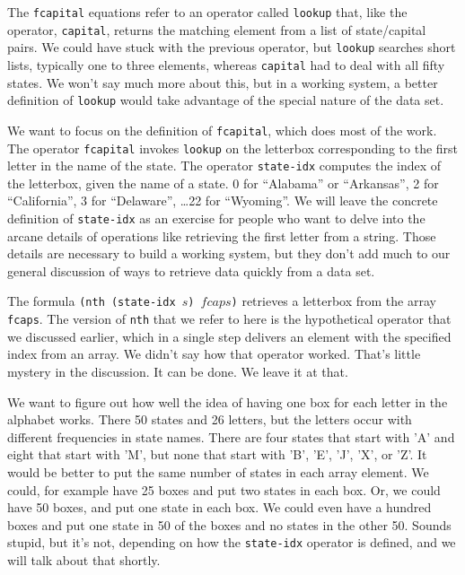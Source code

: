 The \texttt{fcapital} equations refer to an operator
called \texttt{lookup} that, like the operator, \texttt{capital},
returns the matching element from a list of state/capital pairs.
We could have stuck with the previous operator,
but \texttt{lookup} searches short lists,
typically one to three elements,
whereas \texttt{capital} had to deal with all fifty states.
We won't say much more about this, but in a working system,
a better definition of \texttt{lookup}
would take advantage of the special nature of the data set.

We want to focus on the definition of \texttt{fcapital},
which does most of the work.
The operator \texttt{fcapital} invokes \texttt{lookup}
on the letterbox corresponding to the first letter
in the name of the state.
The operator \texttt{state-idx} computes the index
of the letterbox, given the name of a state.
0 for ``Alabama'' or ``Arkansas'', 2 for ``California'',
3 for ``Delaware'', \dots 22 for  ``Wyoming''.
We will leave the concrete
definition of \texttt{state-idx} as an exercise for
people who want to delve into the arcane details of
operations like retrieving the first letter from a string.
Those details are necessary to build a working system,
but they don't add much to our general discussion of ways
to retrieve data quickly from a data set.

The formula
\texttt{(nth (state-idx $s$) $fcaps$)}
retrieves a letterbox from the array \texttt{fcaps}.
The version of \texttt{nth} that we refer to here
is the hypothetical operator that we discussed earlier,
which in a single step delivers an element
with the specified index from an array.
We didn't say how that operator worked.
That's little mystery in the discussion.
It can be done. We leave it at that.

We want to figure out
how well the idea of having one box for each letter
in the alphabet works.
There 50 states and 26 letters, but the letters occur
with different frequencies in state names.
There are four states that start with 'A' and
eight that start with 'M',
but none that start with 'B', 'E', 'J', 'X', or 'Z'.
It would be better to put the same number of states in each
array element. We could, for example have 25 boxes and put
two states in each box. Or, we could have 50 boxes, and put
one state in each box.
We could even have a hundred boxes and put one state in 50 
of the boxes and no states in the other 50.
Sounds stupid, but it's not, depending on how
the \texttt{state-idx} operator is defined,
and we will talk about that shortly.

